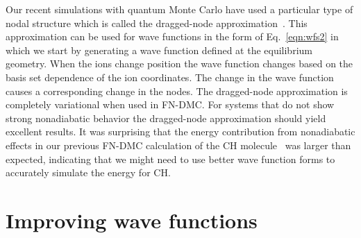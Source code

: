 \documentclass[aip,jcp,numerical,reprint]{revtex4-1}
\begin{document}
Our recent simulations with quantum Monte Carlo have used a particular type of nodal structure which is called the  dragged-node approximation~\cite{Tubman_ECG,Yang2015}.
This approximation can be used for wave functions in the form of Eq.~\eqref{eqn:wfs2} in which  we start by generating a wave function defined at the equilibrium geometry. When the ions change position the wave function changes based on the basis set dependence of the ion coordinates. The change in the wave function causes a corresponding change in the nodes. The dragged-node approximation is completely variational when used in FN-DMC.  
For systems that do not show strong nonadiabatic behavior the dragged-node approximation should yield excellent results. %
 It was surprising that the energy contribution from nonadiabatic effects in our previous FN-DMC calculation of the CH molecule~\cite{Yang2015} was larger than expected, indicating that we might need to use better wave function forms to accurately simulate the energy for CH.   %

\section{Improving wave functions}
\end{document}
